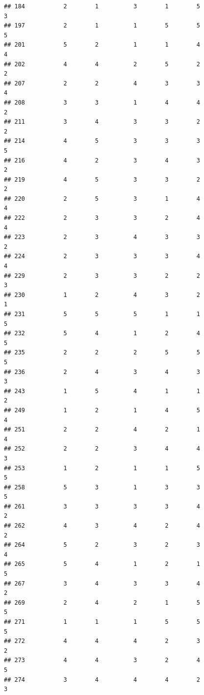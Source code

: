 \documentclass[
]{article}
\begin{document}
\begin{verbatim}
## 184           2        1          3        1        5               3
## 197           2        1          1        5        5               5
## 201           5        2          1        1        4               4
## 202           4        4          2        5        2               2
## 207           2        2          4        3        3               4
## 208           3        3          1        4        4               2
## 211           3        4          3        3        2               2
## 214           4        5          3        3        3               5
## 216           4        2          3        4        3               2
## 219           4        5          3        3        2               2
## 220           2        5          3        1        4               4
## 222           2        3          3        2        4               4
## 223           2        3          4        3        3               2
## 224           2        3          3        3        4               4
## 229           2        3          3        2        2               3
## 230           1        2          4        3        2               1
## 231           5        5          5        1        1               5
## 232           5        4          1        2        4               5
## 235           2        2          2        5        5               5
## 236           2        4          3        4        3               3
## 243           1        5          4        1        1               2
## 249           1        2          1        4        5               4
## 251           2        2          4        2        1               4
## 252           2        2          3        4        4               3
## 253           1        2          1        1        5               5
## 258           5        3          1        3        3               5
## 261           3        3          3        3        4               2
## 262           4        3          4        2        4               2
## 264           5        2          3        2        3               4
## 265           5        4          1        2        1               5
## 267           3        4          3        3        4               2
## 269           2        4          2        1        5               5
## 271           1        1          1        5        5               5
## 272           4        4          4        2        3               2
## 273           4        4          3        2        4               5
## 274           3        4          4        4        2               3

\end{verbatim}
\end{document}
